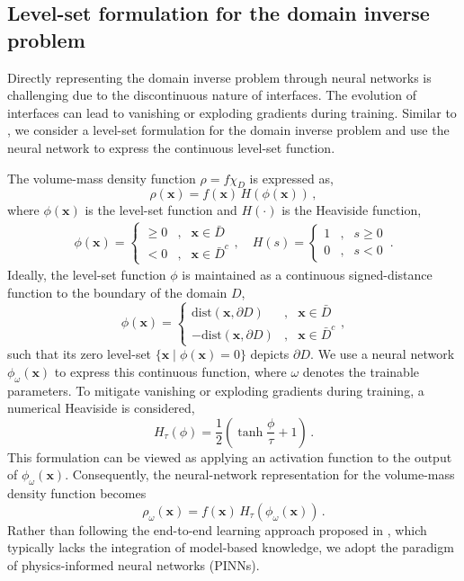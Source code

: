 \documentclass[final,hidelinks,onefignum,onetabnum]{siamart251216}
\begin{document}
\subsection{Level-set formulation for the domain inverse problem}
Directly representing the domain inverse problem through neural networks is challenging due to the discontinuous nature of interfaces. The evolution of interfaces can lead to vanishing or exploding gradients during training. Similar to \cite{cheli24}, we consider a level-set formulation for the domain inverse problem and use the neural network to express the continuous level-set function.

The volume-mass density function $\rho=f\chi_D$ is expressed as,
\begin{equation}
\rho(\mathbf{x})=f(\mathbf{x})\,H(\phi(\mathbf{x}))\,,
\end{equation}
where $\phi(\mathbf{x})$ is the level-set function and $H(\cdot)$ is the Heaviside function,
\begin{eqnarray}
\phi(\mathbf{x})=\left\{\begin{array}{ccc}\ge 0&,&\mathbf{x}\in\bar{D}\\ <0&,&\mathbf{x}\in\bar{D}^c \end{array} \right., \quad H(s)=\left\{\begin{array}{ccc}1&,&s\ge0\\ 0&,&s<0 \end{array} \right.\,.
\end{eqnarray}
Ideally, the level-set function $\phi$ is maintained as a continuous signed-distance function to the boundary of the domain $D$,
\begin{equation} \label{eqn3.3}
\phi(\mathbf{x})=\left\{\begin{array}{ccc}\mathrm{dist}(\mathbf{x},\partial D)&,&\mathbf{x}\in\bar{D}\\ -\mathrm{dist}(\mathbf{x},\partial D)&,&\mathbf{x}\in\bar{D}^c \end{array} \right.,
\end{equation}
such that its zero level-set $\{\mathbf{x}\mid \phi(\mathbf{x})=0\}$ depicts $\partial D$.
We use a neural network $\phi_\omega(\mathbf{x})$ to express this continuous function, where $\omega$ denotes the trainable parameters. To mitigate vanishing or exploding gradients during training, a numerical Heaviside is considered,
\begin{equation}
H_\tau(\phi)=\frac{1}{2}\left(\tanh\frac{\phi}{\tau}+1\right)\,.
\end{equation}
This formulation can be viewed as applying an activation function to the output of $\phi_\omega(\mathbf{x})$. Consequently, the neural-network representation for the volume-mass density function becomes
\begin{equation} \label{eqn_density}
\rho_\omega(\mathbf{x})=f(\mathbf{x})\,H_\tau(\phi_\omega(\mathbf{x}))\,.
\end{equation}
Rather than following the end-to-end learning approach proposed in \cite{cheli24}, which typically lacks the integration of model-based knowledge, we adopt the paradigm of physics-informed neural networks (PINNs).
\end{document}
